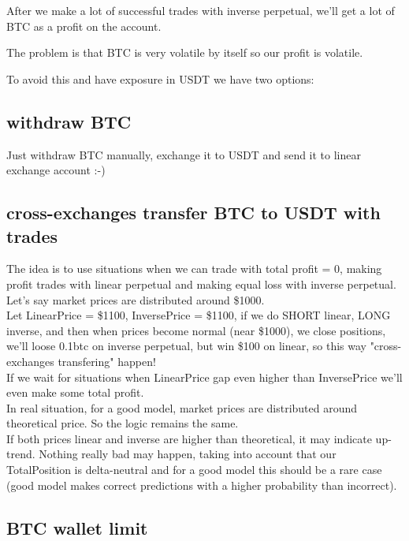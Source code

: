 \documentclass{article}
\begin{document}
After we make a lot of successful trades with inverse perpetual, we'll get a lot of BTC as a profit on the account.

The problem is that BTC is very volatile by itself so our profit is volatile.

To avoid this and have exposure in USDT we have two options:

\subsection{withdraw BTC}

Just withdraw BTC manually, exchange it to USDT and send it to linear exchange account :-)

\subsection{cross-exchanges transfer BTC to USDT with trades}

The idea is to use situations when we can trade with total profit = 0, making profit trades with linear perpetual and making equal loss with inverse perpetual. \\

Let's say market prices are distributed around \$1000. \\

Let LinearPrice = \$1100, InversePrice = \$1100, if we do SHORT linear, LONG inverse, and then when prices become normal (near \$1000), we close positions, we'll loose 0.1btc on inverse perpetual, but win \$100 on linear, so this way "cross-exchanges transfering" happen! \\

If we wait for situations when LinearPrice gap even higher than InversePrice we'll even make some total profit. \\

In real situation, for a good model, market prices are distributed around theoretical price. So the logic remains the same. \\

\warning If both prices linear and inverse are higher than theoretical, it may indicate up-trend. Nothing really bad may happen, taking into account that our TotalPosition is delta-neutral and for a good model this should be a rare case (good model makes correct predictions with a higher probability than incorrect). \\

\subsection{BTC wallet limit}
\end{document}
